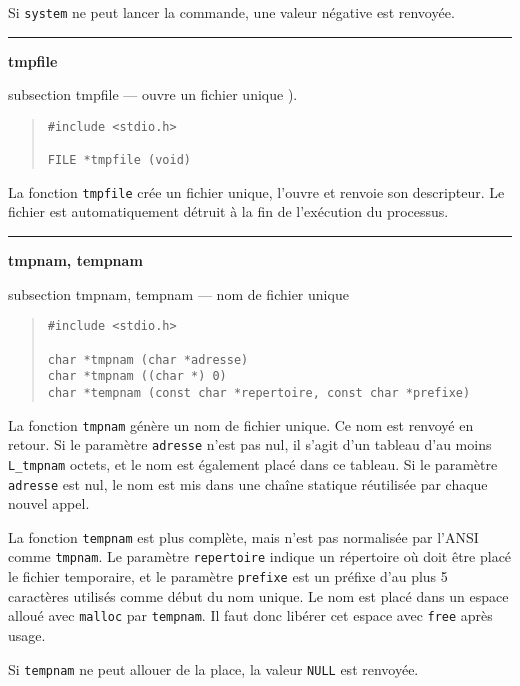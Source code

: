 \documentclass [twoside] {report}
\newcommand {\primitive} [1]
    {
	{\large \bf #1}
	\addcontentsline {toc} {subsection} {#1}
    }
\newcommand {\separation}
    {
	\vspace {7mm}
	\nopagebreak
	\hrule
    }
\begin{document}
Si {\tt system} ne peut lancer la commande, une valeur
négative est renvoyée.



\separation 
\primitive {tmpfile} --- ouvre un fichier unique
    \label {tmpfile}).

\begin {quote}
\begin {verbatim}
#include <stdio.h>

FILE *tmpfile (void)
\end{verbatim}
\end {quote}

La fonction {\tt tmpfile} crée un fichier unique, l'ouvre et renvoie son
descripteur. Le fichier est automatiquement détruit à la fin de
l'exécution du processus.


\separation 
\primitive {tmpnam, tempnam} --- nom de fichier unique

\begin {quote}
\begin {verbatim}
#include <stdio.h>

char *tmpnam (char *adresse)
char *tmpnam ((char *) 0)
char *tempnam (const char *repertoire, const char *prefixe)
\end{verbatim}
\end {quote}

La fonction {\tt tmpnam} génère un nom de fichier unique. Ce nom est
renvoyé en retour. Si le paramètre {\tt adresse} n'est pas nul, il s'agit
d'un tableau d'au moins {\tt L\_tmpnam} octets, et le nom
est également placé dans ce tableau. Si le paramètre {\tt adresse} est
nul, le nom est mis dans une chaîne statique réutilisée par chaque
nouvel appel.

La fonction {\tt tempnam} est plus complète, mais n'est pas normalisée
par l'ANSI comme {\tt tmpnam}. Le paramètre {\tt repertoire} indique un
répertoire où doit être placé le fichier temporaire, et le paramètre
{\tt prefixe} est un préfixe d'au plus 5 caractères utilisés comme début
du nom unique. Le nom est placé dans un espace alloué avec {\tt malloc}
par {\tt tempnam}. Il faut donc libérer cet espace avec {\tt free} après
usage.

Si {\tt tempnam} ne peut allouer de la place, la valeur {\tt NULL} est
renvoyée.


\end{document}
